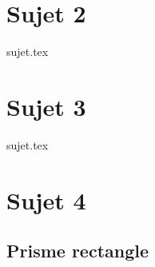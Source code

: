 \documentclass[a4paper, 10pt]{book}
\begin{document}
\chapter{Sujet 2}

{sujet.tex}

\resetQ
\newpage

\chapter{Sujet 3}

{sujet.tex}

\resetQ
\newpage

\chapter{Sujet 4}

\section{Prisme rectangle}
\end{document}
